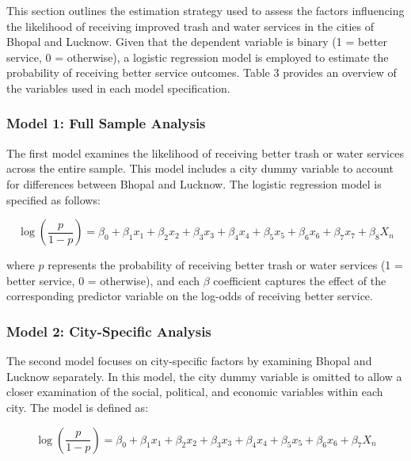 This section outlines the estimation strategy used to assess the factors influencing the likelihood of receiving improved trash and water services in the cities of Bhopal and Lucknow. Given that the dependent variable is binary (1 = better service, 0 = otherwise), a logistic regression model is employed to estimate the probability of receiving better service outcomes. Table 3 provides an overview of the variables used in each model specification.

\subsubsection*{Model 1: Full Sample Analysis}

The first model examines the likelihood of receiving better trash or water services across the entire sample. This model includes a city dummy variable to account for differences between Bhopal and Lucknow. The logistic regression model is specified as follows:

\begin{equation}
\log \left( \frac{p}{1-p} \right) = \beta_0 + \beta_1 x_1 + \beta_2 x_2 + \beta_3 x_3 + \beta_4 x_4 + \beta_5 x_5 + \beta_6 x_6 + \beta_7 x_7 + \beta_8 X_n
\end{equation}

where \( p \) represents the probability of receiving better trash or water services (1 = better service, 0 = otherwise), and each  \( \beta \)
coefficient captures the effect of the corresponding predictor variable on the log-odds of receiving better service.

\subsubsection*{Model 2: City-Specific Analysis}

The second model focuses on city-specific factors by examining Bhopal and Lucknow separately. In this model, the city dummy variable is omitted to allow a closer examination of the social, political, and economic variables within each city. The model is defined as:

\begin{equation}
\log \left( \frac{p}{1-p} \right) = \beta_0 + \beta_1 x_1 + \beta_2 x_2 + \beta_3 x_3 + \beta_4 x_4 + \beta_5 x_5 + \beta_6 x_6 + \beta_7 X_n
\end{equation}

